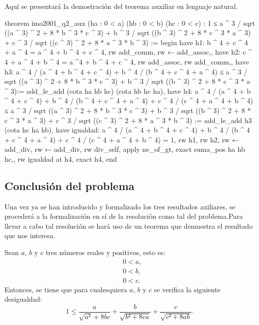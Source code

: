\begin{demostracion}
  Aquí se presentará la demostración del teorema auxiliar en lenguaje
  natural.
\end{demostracion}

\begin{leancode}
theorem imo2001_q2_aux (ha : 0 < a) (hb : 0 < b) (hc : 0 < c) :
  1 ≤ a ^ 3 / sqrt ((a ^ 3) ^ 2 + 8 * b ^ 3 * c ^ 3) +
      b ^ 3 / sqrt ((b ^ 3) ^ 2 + 8 * c ^ 3 * a ^ 3) +
      c ^ 3 / sqrt ((c ^ 3) ^ 2 + 8 * a ^ 3 * b ^ 3) :=
begin
  have h1: b ^ 4 + c ^ 4 + a ^ 4 = a ^ 4 + b ^ 4 + c ^ 4,
  {rw add_comm,
   rw ← add_assoc,},
  have h2: c ^ 4 + a ^ 4 + b ^ 4 = a ^4 + b ^ 4 + c ^ 4,
  {rw add_assoc,
   rw add_comm,},
   have h3: a ^ 4 / (a ^ 4 + b ^ 4 + c ^ 4) + 
    b ^ 4 / (b ^ 4 + c ^ 4 + a ^ 4) ≤  
    a ^ 3 / sqrt ((a ^ 3) ^ 2 + 8 * b ^ 3 * c ^ 3) + 
    b ^ 3 / sqrt ((b ^ 3) ^ 2 + 8 * c ^ 3 * a ^ 3):= 
    add_le_add (cota ha hb hc) (cota hb hc ha),
    have h4: a ^ 4 / (a ^ 4 + b ^ 4 + c ^ 4) + 
    b ^ 4 / (b ^ 4 + c ^ 4 + a ^ 4) +
    c ^ 4 / (c ^ 4 + a ^ 4 + b ^ 4) ≤  
    a ^ 3 / sqrt ((a ^ 3) ^ 2 + 8 * b ^ 3 * c ^ 3) + 
    b ^ 3 / sqrt ((b ^ 3) ^ 2 + 8 * c ^ 3 * a ^ 3) +
    c ^ 3 / sqrt ((c ^ 3) ^ 2 + 8 * a ^ 3 * b ^ 3) :=
    add_le_add h3 (cota hc ha hb),
    have igualdad: a ^ 4 / (a ^ 4 + b ^ 4 + c ^ 4) + 
    b ^ 4 / (b ^ 4 + c ^ 4 + a ^ 4) +
    c ^ 4 / (c ^ 4 + a ^ 4 + b ^ 4) = 1,
    {rw h1,
     rw h2,
     rw ← add_div,
     rw ← add_div,
     rw div_self,
     apply ne_of_gt,
     exact suma_pos ha hb hc,},
     rw igualdad at h4,
     exact h4,
end
\end{leancode}


\subsection{Conclusión del problema}
Una vez ya se han introducido y formalizado los tres resultados
axiliares, se procederá a la formalización en sí de la resolución
como tal del problema.Para llevar a cabo tal resolución se hará uso
de un teorema que demuestra el resultado que nos interesa.

\begin{teorema}
  Sean \(a\), \(b\) y \(c\) tres números reales y positivos, esto es:
  \begin{align}
    &0<a, \label{haq2te}\tag{ha}\\
    &0<b, \label{hbq2te}\tag{hb}\\
    &0<c. \label{hcq2te}\tag{hc}
  \end{align}
  Entonces, se tiene que para cualesquiera \(a\), \(b\) y \(c\) se
  verifica la siguiente desigualdad:
  \begin{equation}
    1≤\frac{a}{\sqrt{a²}+8bc}+\frac{b}{\sqrt{b²+8ca}}+
    \frac{c}{\sqrt{c²+8ab}}.
  \end{equation}
\end{teorema}

